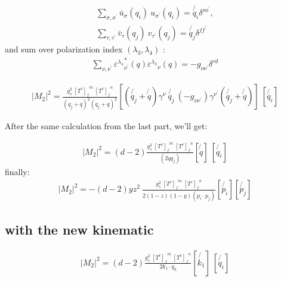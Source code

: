 \begin{equation}
\begin{split}
\displaystyle\sum\limits_{{\sigma},{\sigma}^{\prime}} {\bar{u}}_{\sigma}(q_i)\:u_{{\sigma}^{\prime}}(q_i) = \not{q_i} \delta^{{o}{o}^{\prime}},\\
\displaystyle\sum\limits_{{\tau},{\tau}^{\prime}} {\bar{v}}_{\tau}(q_j)\:v_{{\tau}^{\prime}}(q_j) = \not{q_j} \delta^{{f}{f}^{\prime}}
\end{split}
\end{equation}
and sum over polarization index $({\lambda_{3}},{\lambda}_{4})$ :
\begin{equation}
\begin{split}
 \displaystyle\sum\limits_{{\nu},{\nu}^{\prime}} {{\varepsilon^{\lambda_4}}_{{\nu}^{\prime}}^* (q) {\varepsilon^{\lambda_3}}_{\nu} (q)} = -g_{{\nu}{\nu}^{\prime}} \delta^{{c}{d}}
\end{split}
\end{equation}

\begin{equation}
\begin{split}
|M_2|^2 =\frac{g_s^2 \: {[T^c]_f}^m \: {[T^c]_{f}}^n }{(q_j + q)^2 (q_j + q)^2} [(\not{q_j} + \not{q}) \gamma^{\nu}  \:\not{q_j}\: (-g_{{\nu}{{\nu}^{\prime}}}) \gamma^{{\nu}^{\prime}}(\not{q_j} + \not{q})]\: 
[\not{q_i} ]
\end{split}
\end{equation}

After the same calculation from the last part, we'll get:

\begin{equation}
\begin{split}
|M_2|^2 =(d-2) \frac{g_s^2 \: {[T^c]_f}^m \: {[T^c]_{f}}^n }{(2qq_j)} [\not{q}]\: 
[\not{q_i} ]
\end{split}
\end{equation}
finally:
\begin{equation}
\begin{split}
|M_2|^2=-(d-2)yz^2\:\frac{g_s^2 \: {[T^c]_f}^m \: {[T^c]_{f}}^n }{2(1-z)(1-y)(p_i \cdot p_j)}
[\not{p_i}][\not{p_j}]
\end{split}
\end{equation}
\newpage

\subsection*{with the new kinematic}

\begin{equation}
\begin{split}
|M_2|^2 =(d-2) \frac{g_s^2 \: {[T^c]_f}^m \: {[T^c]_{f}}^n }{2k_1 \cdot q_k} [\not{k_1}]\: 
[\not{q_i} ]
\end{split}
\end{equation}

